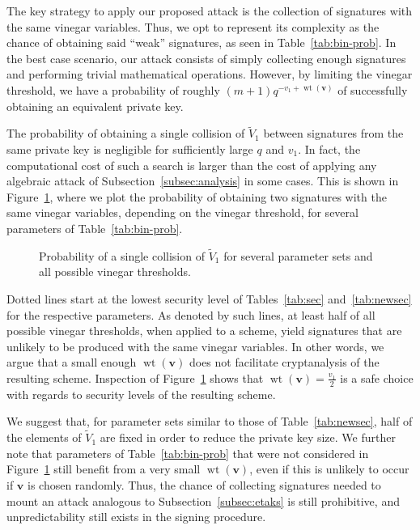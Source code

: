 \documentclass[12pt, a4paper, oneside]{memoir}
\DeclareMathOperator*{\wt}{wt}
\theoremstyle{definition}
\begin{document}
The key strategy to apply our proposed attack is the collection of signatures with the same vinegar variables. Thus, we opt to represent its complexity as the chance of obtaining said ``weak'' signatures, as seen in Table~\ref{tab:bin-prob}. In the best case scenario, our attack consists of simply collecting enough signatures and performing trivial mathematical operations. However, by limiting the vinegar threshold, we have a probability of roughly $(m + 1) q^{-v_{1} + \wt(\mathbf{v})}$ of successfully obtaining an equivalent private key.

The probability of obtaining a single collision of $\widetilde{V}_{1}$ between signatures from the same private key is negligible for sufficiently large $q$ and $v_{1}$. In fact, the computational cost of such a search is larger than the cost of applying any algebraic attack of Subsection~\ref{subsec:analysis} in some cases. This is shown in Figure~\ref{fig:prob-sec}, where we plot the probability of obtaining two signatures with the same vinegar variables, depending on the vinegar threshold, for several parameters of Table~\ref{tab:bin-prob}.

\begin{figure}[htbp]
  \centering
  \caption{Probability of a single collision of $\widetilde{V}_{1}$ for several parameter sets and all possible vinegar thresholds.}\label{fig:prob-sec}
\end{figure}

Dotted lines start at the lowest security level of Tables~\ref{tab:sec} and~\ref{tab:newsec} for the respective parameters. As denoted by such lines, at least half of all possible vinegar thresholds, when applied to a scheme, yield signatures that are unlikely to be produced with the same vinegar variables. In other words, we argue that a small enough $\wt(\mathbf{v})$ does not facilitate cryptanalysis of the resulting scheme. Inspection of Figure~\ref{fig:prob-sec} shows that $\wt(\mathbf{v}) = \frac{v_{1}}{2}$ is a safe choice with regards to security levels of the resulting scheme. 

We suggest that, for parameter sets similar to those of Table~\ref{tab:newsec}, half of the elements of $\widetilde{V}_{1}$ are fixed in order to reduce the private key size. We further note that parameters of Table~\ref{tab:bin-prob} that were not considered in Figure~\ref{fig:prob-sec} still benefit from a very small $\wt(\mathbf{v})$, even if this is unlikely to occur if $\mathbf{v}$ is chosen randomly. Thus, the chance of collecting signatures needed to mount an attack analogous to  Subsection~\ref{subsec:etaks} is still prohibitive, and unpredictability still exists in the signing procedure.
\end{document}
